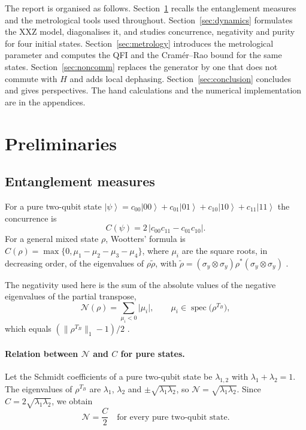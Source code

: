 \documentclass[11pt,a4paper]{article}
\newcommand{\ket}[1]{\left|#1\right\rangle}
\begin{document}
The report is organised as follows. Section~\ref{sec:prelim} recalls the entanglement measures and the metrological tools used throughout. Section~\ref{sec:dynamics} formulates the XXZ model, diagonalises it, and studies concurrence, negativity and purity for four initial states. Section~\ref{sec:metrology} introduces the metrological parameter and computes the QFI and the Cram\'er--Rao bound for the same states. Section~\ref{sec:noncomm} replaces the generator by one that does not commute with $H$ and adds local dephasing. Section~\ref{sec:conclusion} concludes and gives perspectives. The hand calculations and the numerical implementation are in the appendices.

\section{Preliminaries}\label{sec:prelim}

\subsection{Entanglement measures}

For a pure two-qubit state $\ket{\psi}=c_{00}\ket{00}+c_{01}\ket{01}+c_{10}\ket{10}+c_{11}\ket{11}$ the concurrence is
\begin{equation}
  C(\psi)=2\,\lvert c_{00}c_{11}-c_{01}c_{10}\rvert .
\end{equation}
For a general mixed state $\rho$, Wootters' formula is $C(\rho)=\max\{0,\mu_1-\mu_2-\mu_3-\mu_4\}$, where $\mu_i$ are the square roots, in decreasing order, of the eigenvalues of $\rho\tilde\rho$, with $\tilde\rho=(\sigma_y\otimes\sigma_y)\rho^{*}(\sigma_y\otimes\sigma_y)$ \cite{Wootters1998}.

The negativity used here is the sum of the absolute values of the negative eigenvalues of the partial transpose,
\begin{equation}
  \mathcal N(\rho)=\sum_{\mu_i<0}\lvert\mu_i\rvert,\qquad \mu_i\in\operatorname{spec}\bigl(\rho^{T_B}\bigr),
\end{equation}
which equals $(\lVert\rho^{T_B}\rVert_1-1)/2$ \cite{VidalWerner2002}.

\paragraph{Relation between $\mathcal N$ and $C$ for pure states.}
Let the Schmidt coefficients of a pure two-qubit state be $\lambda_{1,2}$ with $\lambda_1+\lambda_2=1$. The eigenvalues of $\rho^{T_B}$ are $\lambda_1$, $\lambda_2$ and $\pm\sqrt{\lambda_1\lambda_2}$, so $\mathcal N=\sqrt{\lambda_1\lambda_2}$. Since $C=2\sqrt{\lambda_1\lambda_2}$, we obtain
\begin{equation}
  \mathcal N=\frac{C}{2}\quad\text{for every pure two-qubit state.}
\end{equation}
\end{document}
